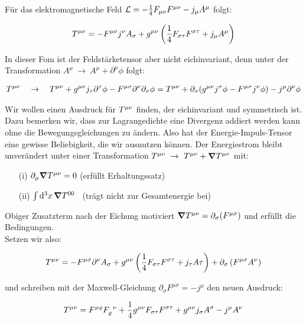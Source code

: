 Für das elektromagnetische Feld $\mathcal{L} = -\frac{1}{4} F_{\mu \nu} F^{\mu \nu} - j_{\mu}A^{\mu}$ folgt:

\begin{align}
T^{\mu\nu} = - F^{\mu \nu} j^{\nu}A_{\sigma}+g^{\mu\nu}\left( \frac{1}{4} F_{\sigma\tau}F^{\sigma\tau}+j_{\mu}A^{\mu}\right)
\end{align}

In dieser Fom ist der Feldstärketensor aber nicht eichinvariant, denn unter der Transformation $A^{\mu} \ \rightarrow \ A^{\mu} + \partial^{\mu}\phi$ folgt:

\begin{align}
T^{\mu\nu} \quad \rightarrow \quad T^{\mu\nu} + g^{\mu\nu}j_{\tau}\partial^{\tau}\phi-F^{\mu\sigma}\partial^{\nu}\partial_{\sigma}\phi = T^{\mu\nu} + \partial_{\sigma}(g^{\mu\nu}j^{\sigma}\phi - F^{\mu\sigma}j^{\nu}\phi) - j^{\mu}\partial^{\nu}\phi
\end{align}

Wir wollen einen Ausdruck für $T^{\mu\nu}$ finden, der eichinvariant und symmetrisch ist. \\
Dazu bemerken wir, dass zur Lagrangedichte eine Divergenz addiert werden kann ohne die Bewegungsgleichungen zu ändern. Also hat der Energie-Impuls-Tensor eine gewisse Beliebigkeit, die wir ausnutzen können. 
Der Energiestrom bleibt unverändert unter einer Transformation $T^{\mu\nu} \ \rightarrow \ T^{\mu\nu}+ \grad{T^{\mu\nu}}$ mit: 

\begin{enumerate}
\item[(i)] $\partial_{\mu}\grad{T^{\mu\nu}}=0$ \qquad (erfüllt Erhaltungssatz)
\item[(ii)] $ \int \dd[3]{x} \grad{T^{00}}$ \qquad \ (trägt nicht zur Gesamtenergie bei)
\end{enumerate}

Obiger Zusatzterm nach der Eichung motiviert $\grad{T^{\mu\nu}}=\partial_{\sigma}(F^{\mu\sigma})$ und erfüllt die Bedingungen. \\
Setzen wir also:

\begin{align}
T^{\mu\nu} = -F^{\mu\sigma}\partial^{\nu}A_{\sigma} + g^{\mu\nu}\left( \frac{1}{4}F_{\sigma\tau}F^{\sigma\tau} + j_{\tau}A{\tau} \right) + \partial_{\sigma} \left(F^{\mu\sigma}A^{\nu} \right)
\end{align}

und schreiben mit der Maxwell-Gleichung $\partial_{\sigma}F^{\mu\sigma}=-j^{\mu}$ den neuen Ausdruck:

\begin{align}
T^{\mu\nu} = F^{\mu\varrho}F_{\varrho}^{\phantom{\varrho}\nu} + \frac{1}{4}g^{\mu\nu}F_{\sigma\tau}F^{\sigma\tau} + g^{\mu\nu}j_{\sigma}A^{\sigma} - j^{\mu}A^{\nu}
\end{align}

